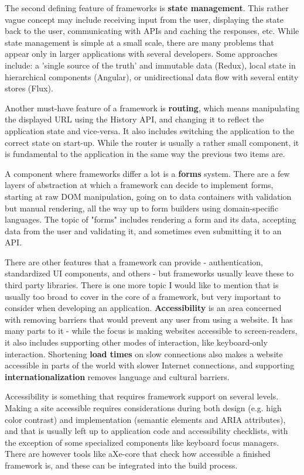 \documentclass[english,odsaz]{fitthesis}
\begin{document}
The second defining feature of frameworks is \textbf{state management}. This rather vague
concept may include receiving input from the user, displaying the state back to
the user, communicating with APIs and caching the responses, etc. While state
management is simple at a small scale, there are many problems that appear only
in larger applications with several developers. Some approaches include: a
'single source of the truth' and immutable data (Redux), local state in
hierarchical components (Angular), or unidirectional data flow with several
entity stores (Flux).

Another must-have feature of a framework is \textbf{routing}, which means manipulating
the displayed URL using the History API, and changing it to reflect the
application state and vice-versa. It also includes switching the application to
the correct state on start-up. While the router is usually a rather small
component, it is fundamental to the application in the same way the previous two
items are.

A component where frameworks differ a lot is a \textbf{forms} system. There are a few
layers of abstraction at which a framework can decide to implement forms,
starting at raw DOM manipulation, going on to data containers with validation
but manual rendering, all the way up to form builders using domain-specific
languages. The topic of "forms" includes rendering a form and its data,
accepting data from the user and validating it, and sometimes even submitting it
to an API.

There are other features that a framework can provide - authentication,
standardized UI components, and others - but frameworks usually leave these to
third party libraries. There is one more topic I would like to mention that is
usually too broad to cover in the core of a framework, but very important to
consider when developing an application. \textbf{Accessibility} is an area concerned with
removing barriers that would prevent any user from using a website. It has many
parts to it - while the focus is making websites accessible to screen-readers,
it also includes supporting other modes of interaction, like keyboard-only
interaction. Shortening \textbf{load times} on slow connections also makes a website
accessible in parts of the world with slower Internet connections, and
supporting \textbf{internationalization} removes language and cultural barriers.

Accessibility is something that requires framework support on several
levels. Making a site accessible requires considerations during both design
(e.g. high color contrast) and implementation (semantic elements and ARIA
attributes), and that is usually left up to application code and accessibility
checklists, with the exception of some specialized components like keyboard
focus managers. There are however tools like aXe-core that check how accessible
a finished framework is, and these can be integrated into the build process.
\end{document}
